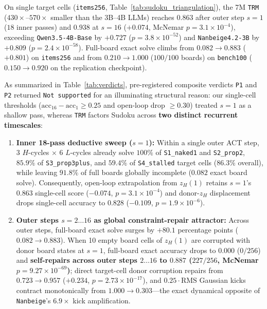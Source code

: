 \documentclass[10pt,letterpaper]{article}
\begin{document}
On single target cells (\texttt{items256}, Table~\ref{tab:sudoku_triangulation}), the 7M \texttt{TRM} ($430\times$--$570\times$ smaller than the 3B--4B LLMs) reaches $0.863$ after outer step $s=1$ ($18$ inner passes) and $\mathbf{0.938}$ at $s=16$ ($+0.074$, McNemar $p=3.1\times 10^{-4}$), exceeding \texttt{Qwen3.5-4B-Base} by $+0.727$ ($p=3.8\times 10^{-52}$) and \texttt{Nanbeige4.2-3B} by $+0.809$ ($p=2.4\times 10^{-58}$). Full-board exact solve climbs from $\mathbf{0.082 \to 0.883}$ ($+0.801$) on \texttt{items256} and from $\mathbf{0.210 \to 1.000}$ ($100/100$ boards) on \texttt{bench100} ($0.150 \to 0.920$ on the replication checkpoint).

As summarized in Table~\ref{tab:verdicts}, pre-registered composite verdicts \texttt{P1} and \texttt{P2} returned \texttt{Not supported} for an illuminating structural reason: our single-cell thresholds ($\text{acc}_{16}-\text{acc}_1 \ge 0.25$ and open-loop drop $\ge 0.30$) treated $s=1$ as a shallow pass, whereas \texttt{TRM} factors Sudoku across \textbf{two distinct recurrent timescales}:
\begin{enumerate}[topsep=3pt,itemsep=2pt]
  \item \textbf{Inner 18-pass deductive sweep ($s=1$):} Within a single outer ACT step, 3 $H$-cycles $\times$ 6 $L$-cycles already solve $100\%$ of \texttt{S1\_naked1} and \texttt{S2\_prop2}, $85.9\%$ of \texttt{S3\_prop3plus}, and $59.4\%$ of \texttt{S4\_stalled} target cells ($86.3\%$ overall), while leaving $91.8\%$ of full boards globally incomplete ($0.082$ exact board solve). Consequently, open-loop extrapolation from $z_H(1)$ retains $s=1$'s $0.863$ single-cell score ($-0.074$, $p=3.1\times 10^{-4}$) and donor-$z_H$ displacement drops single-cell accuracy to $0.828$ ($-0.109$, $p=1.9\times 10^{-6}$).
  \item \textbf{Outer steps $s=2\dots 16$ as global constraint-repair attractor:} Across outer steps, full-board exact solve surges by $+80.1$ percentage points ($0.082 \to 0.883$). When 10 empty board cells of $z_H(1)$ are corrupted with donor board states at $s=1$, full-board exact accuracy drops to $\mathbf{0.000}$ ($0/256$) and \textbf{self-repairs across outer steps $2\dots 16$ to $0.887$ ($227/256$, McNemar $p=9.27\times 10^{-69}$)}; direct target-cell donor corruption repairs from $0.723 \to 0.957$ ($+0.234$, $p=2.73\times 10^{-17}$), and $0.25\cdot\mathrm{RMS}$ Gaussian kicks contract monotonically from $1.000 \to 0.303$—the exact dynamical opposite of \texttt{Nanbeige}'s $6.9\times$ kick amplification.
\end{enumerate}
\end{document}
